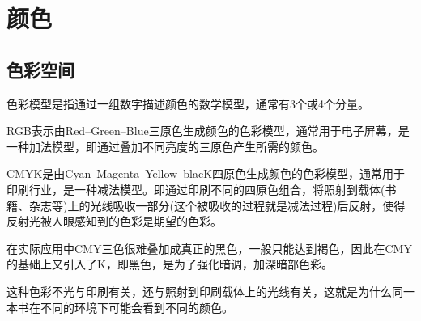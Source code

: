 
\chapter{颜色}
\label{chap:color}

\section{色彩空间}
\label{sec:color-space}

\begin{definition}
  色彩模型是指通过一组数字描述颜色的数学模型，通常有3个或4个分量。
\end{definition}

\begin{example}
  {\color{red}R}{\color{green}G}{\color{blue}B}表示由{\color{red}Red}--{\color{green}Green}--{\color{blue}Blue}三原色生成颜色的色彩模型，通常用于电子屏幕，是一种加法模型，即通过叠加不同亮度的三原色产生所需的颜色。
\end{example}

\begin{example}[CMYK色彩模型]
  {\color{cyan}C}{\color{magenta}M}{\color{yellow}Y}{\color{black}K}是由{\color{cyan}Cyan}--{\color{magenta}Magenta}--{\color{yellow}Yellow}--{\color{black}blacK}四原色生成颜色的色彩模型，通常用于印刷行业，是一种减法模型。即通过印刷不同的四原色组合，将照射到载体(书籍、杂志等)上的光线吸收一部分(这个被吸收的过程就是减法过程)后反射，使得反射光被人眼感知到的色彩是期望的色彩。

  在实际应用中{\color{cyan}C}{\color{magenta}M}{\color{yellow}Y}三色很难叠加成真正的黑色，一般只能达到褐色，因此在{\color{cyan}C}{\color{magenta}M}{\color{yellow}Y}的基础上又引入了K，即黑色，是为了强化暗调，加深暗部色彩。

  这种色彩不光与印刷有关，还与照射到印刷载体上的光线有关，这就是为什么同一本书在不同的环境下可能会看到不同的颜色。
\end{example}

\begin{example}[HSV色彩模型]
  
\end{example}

\begin{definition}[YUV]
  
\end{definition}

\begin{definition}[色域]
  
\end{definition}

